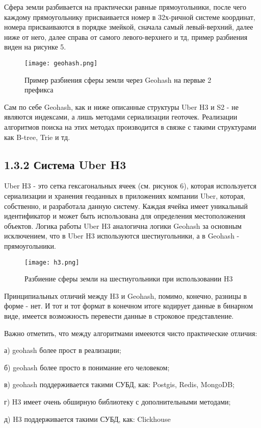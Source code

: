 Сфера земли разбивается на практически равные прямоугольники, после чего каждому прямоугольнику присваивается номер в 32х-ричной системе координат, номера присваиваются в порядке змейкой, сначала самый левый-верхний, далее ниже от него, далее справа от самого левого-верхнего и тд, пример разбиения виден на рисунке 5.
\par\vspace{1em}
\begin{figure}[H]
    \centering
    \texttt{[image: geohash.png]}
    \caption{Пример разбиения сферы земли через Geohash на первые 2 префикса}
\end{figure}

Сам по себе Geohash, как и ниже описанные структуры Uber H3 и S2 - не являются индексами\cite{balkicGeohash}, а лишь методами сериализации геоточек. Реализации алгоритмов поиска на этих методах производится в связке с такими структурами как B-tree, Trie и тд. 

\subsection{1.3.2 Система Uber H3}
Uber H3 - это сетка гексагональных ячеек (см. рисунок 6), которая используется сериализации и хранения геоданных в приложениях компании Uber, которая, собственно, и разработала данную систему. Каждая ячейка имеет уникальный идентификатор и может быть использована для определения местоположения объектов. Логика работы Uber H3 аналогична логики Geohash за основным исключением, что в Uber H3 используются шестиугольники, а в Geohash - прямоугольники. 
  \\
\begin{figure}[h]
    \centering
    \texttt{[image: h3.png]}
    \caption{Разбиение сферы земли на шестиугольники при использовании H3}
\end{figure}

Принципиальных отличий между H3 и Geohash\cite{bohuiGeohashH2S2}, помимо, конечно, разницы в форме - нет. И тот и тот формат в конечном итоге кодирует данные в бинарном виде, имеется возможность перевести данные в строковое представление.  

Важно отметить, что между алгоритмами имееются чисто практические отличия:
\par а) geohash более прост в реализации;
\par б) geohash более просто в понимание его человеком;
\par в) geohash поддерживается такими СУБД, как: Postgis, Redis, MongoDB\cite{membreyMongodb};
\par г) H3 имеет очень обширную библиотеку с дополнительными методами;
\par д) H3 поддерживается такими СУБД, как: Clickhouse

